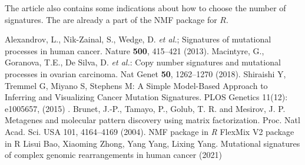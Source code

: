 \documentclass[a4paper]{article}
\begin{document}
The article \cite{Brunet} also contains some indications about how to choose the number of signatures. The are already a part of the NMF package for $R$.



\clearpage
\begin{thebibliography}{9}
	Alexandrov, L., Nik-Zainal, S., Wedge, D. \textit{et al.}; Signatures of mutational processes in human cancer. Nature \textbf{500}, 415–421 (2013). 
	Macintyre, G., Goranova, T.E., De Silva, D. \textit{et al.}: Copy number signatures and mutational processes in ovarian carcinoma. Nat Genet \textbf{50}, 1262–1270 (2018).
	Shiraishi Y, Tremmel G, Miyano S, Stephens M: A Simple Model-Based Approach to Inferring and Visualizing Cancer Mutation Signatures. PLOS Genetics 11(12): e1005657,  (2015) .
	Brunet, J.-P., Tamayo, P., Golub, T. R. and Mesirov, J. P. Metagenes and
	molecular pattern discovery using matrix factorization. Proc. Natl Acad. Sci.
	USA 101, 4164–4169 (2004).
	NMF package in \textit{R}
	 FlexMix V2 package in R
	 Lisui Bao, Xiaoming Zhong, Yang Yang, Lixing Yang. Mutational signatures of complex genomic rearrangements in human cancer (2021)
	 
	
\end{thebibliography}
\end{document}
